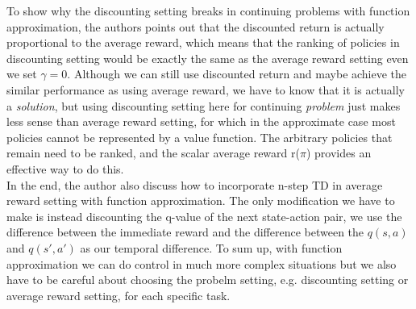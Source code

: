 \documentclass[12pt,a4paper]{article}
\begin{document}
To show why the discounting setting breaks in continuing problems with function approximation, the authors points out that the discounted return is actually proportional to the average reward, which means that the ranking of policies in discounting setting would be exactly the same as the average reward setting even we set $\gamma = 0$. Although we can still use discounted return and maybe achieve the similar performance as using average reward, we have to know that it is actually a \textit{solution}, but using discounting setting here for continuing \textit{problem} just makes less sense than average reward setting, for which in the approximate case most policies cannot be represented by a value function. The arbitrary policies that remain need to be ranked, and the scalar average reward r($\pi$) provides an effective way to do this.\\   

In the end, the author also discuss how to incorporate n-step TD in average reward setting with function approximation. The only modification we have to make is instead discounting the q-value of the next state-action pair, we use the difference between the immediate reward and the difference between the $q(s, a)$ and $q(s', a')$ as our temporal difference. To sum up, with function approximation we can do control in much more complex situations but we also have to be careful about choosing the probelm setting, e.g. discounting setting or average reward setting, for each specific task. 
\end{document}

